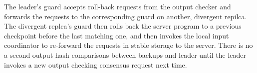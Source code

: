 The leader's guard accepts roll-back requests from the output checker and 
forwards the requests to the corresponding guard on another, divergent repilca. 
The divergent replca's guard then rolls back the server program to a previous 
checkpoint before the last matching one, and then invokes the local input 
coordinator to re-forward the requests in stable storage to the server. There 
is no a second output hash comparisons between backups and leader until the 
leader invokes a new output checking consensus request next time.


% 
% 




